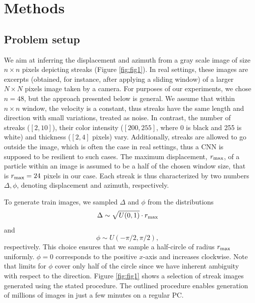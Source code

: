 \documentclass{svjour3}                     %
\begin{document}
\section{Methods}
\label{sec:methodology}

\subsection{Problem setup}

We aim at inferring the displacement and azimuth from a gray scale image of size $n \times n$ pixels depicting streaks (Figure \ref{fig:fig1}). In real settings, these images are excerpts (obtained, for instance, after applying a sliding window) of a larger $N \times N$ pixels image taken by a camera. For purposes of our experiments, we chose $n = 48$, but the approach presented below is general. We assume that within $n \times n$ window, the velocity is a constant, thus streaks have the same length and direction with small variations, treated as noise. In contrast, the number of streaks ($[2, 10]$), their color intensity ($[200, 255]$, where 0 is black and 255 is white) and thickness ($[2, 4]$ pixels) vary. Additionally, streaks are allowed to go outside the image, which is often the case in real settings, thus a CNN is supposed to be resilient to such cases. The maximum displacement, $r_\textnormal{max}$, of a particle within an image is assumed to be a half of the chosen window size, that is $r_\textnormal{max} = 24$ pixels in our case. Each streak is thus characterized by two numbers $\Delta, \phi$, denoting displacement and azimuth, respectively. 

To generate train images, we sampled $\Delta$ and $\phi$ from the distributions
\begin{equation}
\Delta \sim \sqrt{U(0, 1)} \cdot r_\textnormal{max}
\end{equation}
and
\begin{equation}
\phi \sim U(-\pi/2, \pi/2),
\end{equation}
respectively. This choice ensures that we sample a half-circle of radius $r_\textnormal{max}$ uniformly. $\phi = 0$ corresponds to the positive $x$-axis and increases clockwise. Note that limits for $\phi$ cover only half of the circle since we have inherent ambiguity with respect to the direction. Figure \ref{fig:fig1} shows a selection of streak images generated using the stated procedure. The outlined procedure enables generation of millions of images in just a few minutes on a regular PC. 
\end{document}

